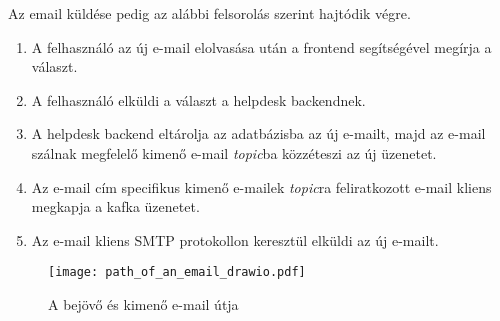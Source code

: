 \bigskip
Az email küldése pedig az alábbi felsorolás szerint hajtódik végre.
\begin{enumerate}
	\item A felhasználó az új e-mail elolvasása után a frontend segítségével megírja a választ.
	\item A felhasználó elküldi a választ a helpdesk backendnek.
	\item A helpdesk backend eltárolja az adatbázisba az új e-mailt, majd az e-mail szálnak megfelelő kimenő e-mail \emph{topic}ba közzéteszi az új üzenetet.
	\item Az e-mail cím specifikus kimenő e-mailek \emph{topic}ra feliratkozott e-mail kliens megkapja a kafka üzenetet.
	\item Az e-mail kliens SMTP protokollon keresztül elküldi az új e-mailt.
\end{enumerate}


\begin{figure}[hbt] 
	\centering
	\texttt{[image: path\_of\_an\_email\_drawio.pdf]}
	\caption{A bejövő és kimenő e-mail útja}
	\label{fig:path_of_an_email}
\end{figure}
